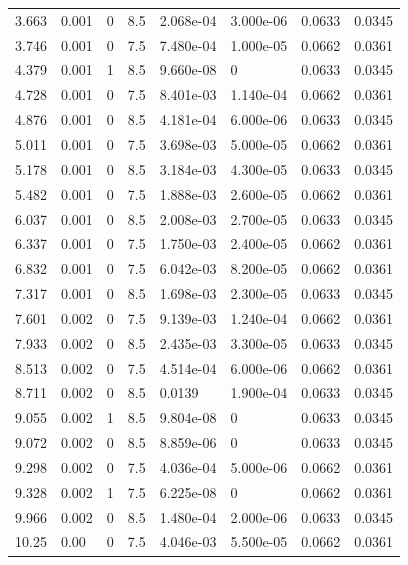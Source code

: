 \documentclass[preview]{standalone}
\begin{document}
{{\begin{tabular}{L{1.2cm}C{1.2cm} C{0.3cm}C{0.5cm} C{1.4cm}C{1.4cm} C{1.4cm}C{1.4cm}}
  3.663  &  0.001  & 0     & 8.5 &  2.068e-04  & 3.000e-06  & 0.0633 &  0.0345   \\ 
  3.746  &  0.001  & 0     & 7.5 &  7.480e-04  & 1.000e-05  & 0.0662 &  0.0361   \\ 
  4.379  &  0.001  & 1     & 8.5 &  9.660e-08  & 0  & 0.0633 &  0.0345   \\ 
  4.728  &  0.001  & 0     & 7.5 &  8.401e-03  & 1.140e-04  & 0.0662 &  0.0361   \\ 
  4.876  &  0.001  & 0     & 8.5 &  4.181e-04  & 6.000e-06  & 0.0633 &  0.0345   \\ 
  5.011  &  0.001  & 0     & 7.5 &  3.698e-03  & 5.000e-05  & 0.0662 &  0.0361   \\ 
  5.178  &  0.001  & 0     & 8.5 &  3.184e-03  & 4.300e-05  & 0.0633 &  0.0345   \\ 
  5.482  &  0.001  & 0     & 7.5 &  1.888e-03  & 2.600e-05  & 0.0662 &  0.0361   \\ 
  6.037  &  0.001  & 0     & 8.5 &  2.008e-03  & 2.700e-05  & 0.0633 &  0.0345   \\ 
  6.337  &  0.001  & 0     & 7.5 &  1.750e-03  & 2.400e-05  & 0.0662 &  0.0361   \\ 
  6.832  &  0.001  & 0     & 7.5 &  6.042e-03  & 8.200e-05  & 0.0662 &  0.0361   \\ 
  7.317  &  0.001  & 0     & 8.5 &  1.698e-03  & 2.300e-05  & 0.0633 &  0.0345   \\ 
  7.601  &  0.002  & 0     & 7.5 &  9.139e-03  & 1.240e-04  & 0.0662 &  0.0361   \\ 
  7.933  &  0.002  & 0     & 8.5 &  2.435e-03  & 3.300e-05  & 0.0633 &  0.0345   \\ 
  8.513  &  0.002  & 0     & 7.5 &  4.514e-04  & 6.000e-06  & 0.0662 &  0.0361   \\ 
  8.711  &  0.002  & 0     & 8.5 &  0.0139  & 1.900e-04  & 0.0633 &  0.0345   \\ 
  9.055  &  0.002  & 1     & 8.5 &  9.804e-08  & 0  & 0.0633 &  0.0345   \\ 
  9.072  &  0.002  & 0     & 8.5 &  8.859e-06  & 0  & 0.0633 &  0.0345   \\ 
  9.298  &  0.002  & 0     & 7.5 &  4.036e-04  & 5.000e-06  & 0.0662 &  0.0361   \\ 
  9.328  &  0.002  & 1     & 7.5 &  6.225e-08  & 0  & 0.0662 &  0.0361   \\ 
  9.966  &  0.002  & 0     & 8.5 &  1.480e-04  & 2.000e-06  & 0.0633 &  0.0345   \\ 
  10.25  &  0.00  & 0     & 7.5 &  4.046e-03  & 5.500e-05  & 0.0662 &  0.0361   \\ 

\end{tabular}}}
\end{document}

